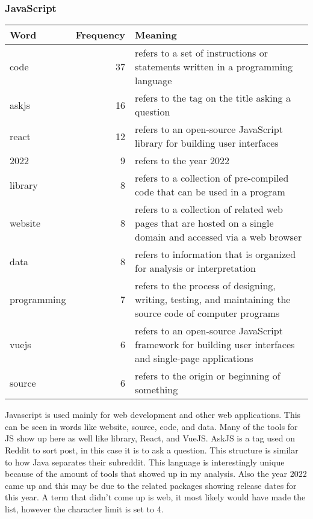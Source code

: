 \documentclass{article}
\theoremstyle{theorem}
\theoremstyle{definition}
\theoremstyle{remark}
\begin{document}
\subsubsection{JavaScript}
\begin{tabular}{ | l | r | p{7cm} | }
\hline
Word & Frequency & Meaning \\
\hline
code & 37 & refers to a set of instructions or statements written in a programming language \\
\hline
askjs & 16 & refers to the tag on the title asking a question\\
\hline
react & 12 & refers to an open-source JavaScript library for building user interfaces \\
\hline
2022 & 9 & refers to the year 2022 \\
\hline
library & 8 & refers to a collection of pre-compiled code that can be used in a program \\
\hline
website & 8 & refers to a collection of related web pages that are hosted on a single domain and accessed via a web browser \\
\hline
data & 8 & refers to information that is organized for analysis or interpretation \\
\hline
programming & 7 & refers to the process of designing, writing, testing, and maintaining the source code of computer programs \\
\hline
vuejs & 6 & refers to an open-source JavaScript framework for building user interfaces and single-page applications \\
\hline
source & 6 & refers to the origin or beginning of something \\
\hline
\end{tabular}

\medskip
Javascript is used mainly for web development and other web applications. This can be seen in words like website, source, code, and data. Many of the tools for JS show up here as well like library, React, and VueJS. AskJS is a tag used on Reddit to sort post, in this case it is to ask a question. This structure is similar to how Java separates their subreddit. This language is interestingly unique because of the amount of tools that showed up in my analysis. Also the year 2022 came up and this may be due to the related packages showing release dates for this year. A term that didn't come up is web, it most likely would have made the list, however the character limit is set to 4.
\end{document}
